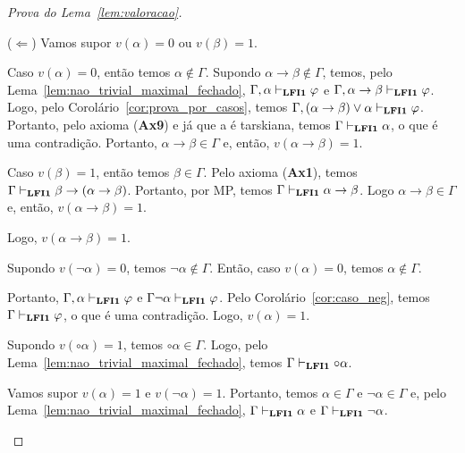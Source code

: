 \begin{proof}[Prova do Lema~\ref{lem:valoracao}]
\begin{provaporcasos}
\begin{adjustwidth}{1cm}{}
                        \noindent ($\Longleftarrow$) Vamos supor $v(\alpha) = 0$ ou $v(\beta) = 1$.

                        \noindent Caso $v(\alpha) = 0$, então temos $\alpha \not \in \Gamma$. Supondo $\alpha \to \beta \not \in \Gamma$, temos, pelo Lema~\ref{lem:nao_trivial_maximal_fechado}, $\Gamma, \alpha \vdash_{{\normalfont\textbf{LFI1}}{}} \varphi$ e $\Gamma, \alpha \to \beta \vdash_{{\normalfont\textbf{LFI1}}{}} \varphi$. Logo, pelo Corolário~\ref{cor:prova_por_casos}, temos $\Gamma, (\alpha \to \beta) \lor \alpha \vdash_{{\normalfont\textbf{LFI1}}{}} \varphi$. Portanto, pelo axioma (\textbf{Ax9}) e já que a \lfium{} é tarskiana, temos $\Gamma \vdash_{{\normalfont\textbf{LFI1}}{}} \alpha$, o que é uma contradição. Portanto, $\alpha \to \beta \in \Gamma$ e, então, $v(\alpha \to \beta) = 1$.

                        \noindent Caso $v(\beta) = 1$, então temos $\beta \in \Gamma$. Pelo axioma (\textbf{Ax1}), temos $\Gamma \vdash_{{\normalfont\textbf{LFI1}}{}} \beta \to (\alpha \to \beta)$. Portanto, por MP, temos $\Gamma \vdash_{{\normalfont\textbf{LFI1}}{}} \alpha \to \beta$. Logo $\alpha \to \beta \in \Gamma$ e, então, $v(\alpha \to \beta) = 1$.

                        \noindent Logo, $v(\alpha \to \beta) = 1$.

                    \end{adjustwidth}

                    
                    \begin{adjustwidth}{1cm}{}
                        \noindent Supondo $v(\neg \alpha) = 0$, temos $\neg \alpha \not \in \Gamma$. Então, caso $v(\alpha) = 0$, temos $\alpha \not \in \Gamma$. 
                        
                        \noindent Portanto, $\Gamma, \alpha \vdash_{{\normalfont\textbf{LFI1}}{}} \varphi$ e $\Gamma \neg \alpha \vdash_{{\normalfont\textbf{LFI1}}{}} \varphi$. Pelo Corolário~\ref{cor:caso_neg}, temos $\Gamma \vdash_{{\normalfont\textbf{LFI1}}{}} \varphi$, o que é uma contradição. Logo, $v(\alpha) = 1$.

                    \end{adjustwidth}


                    \begin{adjustwidth}{1cm}{}
                        \noindent Supondo $v(\circ \alpha) = 1$, temos $\circ \alpha \in \Gamma$. Logo, pelo Lema~\ref{lem:nao_trivial_maximal_fechado}, temos $\Gamma \vdash_{{\normalfont\textbf{LFI1}}{}} \circ \alpha$.

                        \noindent Vamos supor $v(\alpha) = 1$ e $v(\neg \alpha) = 1$. Portanto, temos $\alpha \in \Gamma$ e $\neg \alpha \in \Gamma$ e, pelo Lema~\ref{lem:nao_trivial_maximal_fechado}, $\Gamma \vdash_{{\normalfont\textbf{LFI1}}{}} \alpha$ e $\Gamma \vdash_{{\normalfont\textbf{LFI1}}{}} \neg \alpha$.


\end{adjustwidth}
\end{provaporcasos}
\end{proof}
